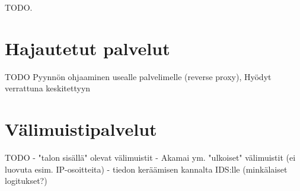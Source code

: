 TODO.

\section{Hajautetut palvelut}

TODO Pyynnön ohjaaminen usealle palvelimelle (reverse proxy), Hyödyt verrattuna keskitettyyn

\section{Välimuistipalvelut}

TODO 
- "talon sisällä" olevat välimuistit
 - Akamai ym. "ulkoiset" välimuistit (ei luovuta esim. IP-osoitteita)
 - tiedon keräämisen kannalta IDS:lle (minkälaiset logitukset?)

